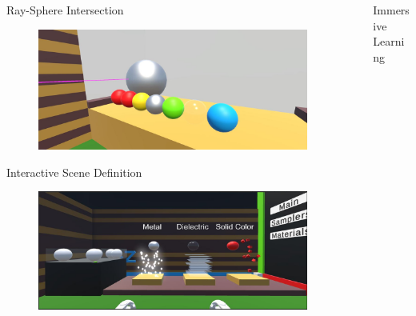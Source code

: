 \documentclass[final,hyperref={pdfpagelabels=false}]{beamer}
\begin{document}
\begin{frame}[t]
\begin{columns}[t]
\begin{column}{.465\textwidth}
\begin{block}{Ray-Sphere Intersection}
    \begin{figure}
    	\centering
        \includegraphics[width=0.95\linewidth]{duringProcessHitObjects}
    \end{figure}
\end{block}

\begin{block}{Interactive Scene Definition}
    \begin{figure}
    	\centering
        \includegraphics[width=0.95\linewidth]{sphereCreating}
    \end{figure}
\end{block}

\end{column}

\begin{column}{.025\textwidth}\end{column} %

\begin{column}{0.465\textwidth} %
\begin{block}{Immersive Learning}
    \vspace{2.2cm}
    

\end{block}
\end{column}
\end{columns}
\end{frame}
\end{document}
